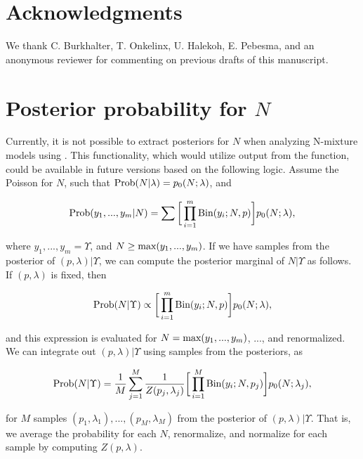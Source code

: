 \documentclass[codesnippet]{jss}
\begin{document}
\section*{Acknowledgments}
We thank C. Burkhalter, T. Onkelinx, U. Halekoh, E. Pebesma, and an anonymous reviewer for commenting on previous drafts of this manuscript.



\appendix

\section{Posterior probability for $N$}
Currently, it is not possible to extract posteriors for $N$ when analyzing N-mixture models using . This functionality, which would utilize output from the  function, could be available in future versions based on the following logic. Assume the Poisson for $N$, such that $\textnormal{Prob} (N | \lambda) = p_0(N; \lambda)$, and

\begin{equation} \label{eq3}
\textnormal{Prob} (y_1, ..., y_m|N) = \sum \bigg[ \prod_{i=1}^{m} 
\textnormal{Bin} (y_i; N, p) \bigg] p_0(N; \lambda),
\end{equation}

where $y_1, ..., y_m = \Upsilon$, and $N \geq \textnormal{max} (y_1, ..., y_m)$. If we have samples from the posterior of $(p, \lambda) | \Upsilon$, we can compute the posterior marginal of $N | \Upsilon$ as follows. If $(p, \lambda)$ is fixed, then

\begin{equation} \label{4}
\textnormal{Prob} (N | \Upsilon) \propto \bigg[ \prod_{i=1}^{m} 
\textnormal{Bin} (y_i; N, p) \bigg] p_0 (N; \lambda),
\end{equation}

and this expression is evaluated for $N = \textnormal{max}(y_1, ..., y_m)$, ..., and renormalized. We can integrate out $(p, \lambda) | \Upsilon$ using samples from the posteriors, as

\begin{equation} \label{5}
\textnormal{Prob} (N | \Upsilon) = \frac{1}{M}  \sum_{j=1}^{M} 
\frac{1}{Z(p_j,\lambda_j)}  \bigg[ \prod_{i=1}^{M} \textnormal{Bin} (y_i; N, 
p_j) \bigg] p_0 (N; \lambda_j),
\end{equation}

for $M$ samples $(p_1, \lambda_1), ..., (p_M, \lambda_M)$ from the posterior of $(p, \lambda) | \Upsilon$. That is, we average the probability for each $N$, renormalize, and normalize for each sample by computing $Z (p, \lambda)$.
\end{document}

